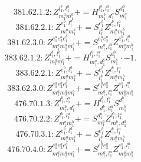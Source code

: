 \documentclass[letterpaper,10pt,fleqn,leqno,onecolumn]{article}
\begin{document}
\begin{equation} \;\;\;\;\;\;  381.62.1.2: Z^{l_{1}^{b},l_{1}^{a}}_{m_{1}^{a}m_{1}^{b}}+=H^{l_{1}^{b},l_{1}^{a}}_{m_{1}^{b},d_{1}^{a}}S^{d_{1}^{a}}_{m_{1}^{a}} \end{equation}
\begin{equation} \;\;\;\;\;\;  381.62.2.1: Z^{e_{1}^{b},l_{1}^{a}}_{m_{1}^{a}m_{1}^{b}}+=S^{e_{1}^{b}}_{l_{1}^{b}}Z^{l_{1}^{b},l_{1}^{a}}_{m_{1}^{a}m_{1}^{b}} \end{equation}
\begin{equation} \;\;\;\;\;\;  381.62.3.0: Z^{e_{1}^{a}e_{2}^{a}e_{1}^{b}}_{m_{1}^{a}m_{2}^{a}m_{1}^{b}}+=S^{e_{1}^{a}e_{2}^{a}}_{m_{1}^{a},l_{1}^{a}}Z^{e_{1}^{b},l_{1}^{a}}_{m_{2}^{a}m_{1}^{b}} \end{equation}
\begin{equation} \;\;\;\;\;\;  383.62.1.2: Z^{l_{1}^{b},l_{1}^{a}}_{m_{1}^{a}m_{1}^{b}}+=H^{l_{1}^{b},l_{1}^{a}}_{m_{1}^{a},d_{1}^{b}}S^{d_{1}^{b}}_{m_{1}^{b}}\cdot -1. \end{equation}
\begin{equation} \;\;\;\;\;\;  383.62.2.1: Z^{e_{1}^{b},l_{1}^{a}}_{m_{1}^{a}m_{1}^{b}}+=S^{e_{1}^{b}}_{l_{1}^{b}}Z^{l_{1}^{b},l_{1}^{a}}_{m_{1}^{a}m_{1}^{b}} \end{equation}
\begin{equation} \;\;\;\;\;\;  383.62.3.0: Z^{e_{1}^{a}e_{2}^{a}e_{1}^{b}}_{m_{1}^{a}m_{2}^{a}m_{1}^{b}}+=S^{e_{1}^{a}e_{2}^{a}}_{m_{1}^{a},l_{1}^{a}}Z^{e_{1}^{b},l_{1}^{a}}_{m_{2}^{a}m_{1}^{b}} \end{equation}
\begin{equation} \;\;\;\;\;\;  476.70.1.3: Z^{l_{1}^{b},l_{1}^{a}}_{m_{1}^{b},d_{1}^{a}}+=H^{l_{1}^{b},l_{1}^{a}}_{d_{1}^{b},d_{1}^{a}}S^{d_{1}^{b}}_{m_{1}^{b}} \end{equation}
\begin{equation} \;\;\;\;\;\;  476.70.2.2: Z^{l_{1}^{b},l_{1}^{a}}_{m_{1}^{a}m_{1}^{b}}+=S^{d_{1}^{a}}_{m_{1}^{a}}Z^{l_{1}^{b},l_{1}^{a}}_{m_{1}^{b},d_{1}^{a}} \end{equation}
\begin{equation} \;\;\;\;\;\;  476.70.3.1: Z^{e_{1}^{b},l_{1}^{a}}_{m_{1}^{a}m_{1}^{b}}+=S^{e_{1}^{b}}_{l_{1}^{b}}Z^{l_{1}^{b},l_{1}^{a}}_{m_{1}^{a}m_{1}^{b}} \end{equation}
\begin{equation} \;\;\;\;\;\;  476.70.4.0: Z^{e_{1}^{a}e_{2}^{a}e_{1}^{b}}_{m_{1}^{a}m_{2}^{a}m_{1}^{b}}+=S^{e_{1}^{a}e_{2}^{a}}_{m_{1}^{a},l_{1}^{a}}Z^{e_{1}^{b},l_{1}^{a}}_{m_{2}^{a}m_{1}^{b}} \end{equation}
\end{document}

